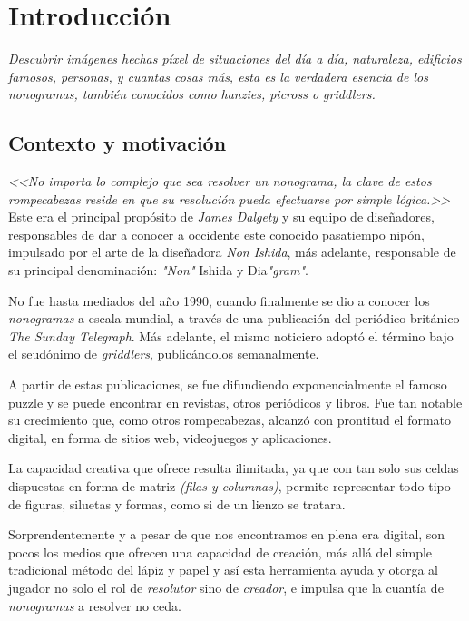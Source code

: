 \chapter{Introducción}

\textit{Descubrir imágenes hechas píxel de situaciones del día a día,
naturaleza, edificios famosos, personas, y cuantas cosas más, esta es la verdadera esencia de
los nonogramas, también conocidos como hanzies, picross o griddlers.}

\section{Contexto y motivación}

\textit{<<No importa lo complejo que sea resolver un nonograma, la clave de
estos rompecabezas reside en que su resolución pueda efectuarse por simple
lógica.>>} Este era el principal propósito de \textit{James Dalgety} y su equipo
de diseñadores, responsables de dar a conocer a occidente este conocido
pasatiempo nipón, impulsado por el arte de la diseñadora \textit{Non Ishida}, más
adelante, responsable de su principal denominación: \textit{"Non"} Ishida y
Dia\textit{"gram"}.

No fue hasta mediados del año 1990, cuando finalmente se dio a conocer los \textit{nonogramas} a escala
mundial, a través de una publicación del periódico británico \textit{The Sunday
Telegraph}. Más adelante, el mismo noticiero adoptó el término bajo el
seudónimo de \textit{griddlers}, publicándolos semanalmente.

A partir de estas publicaciones, se fue difundiendo exponencialmente el famoso puzzle y
se puede encontrar en revistas, otros periódicos y libros. Fue tan notable su
crecimiento que, como otros rompecabezas, alcanzó con prontitud el formato
digital, en forma de sitios web, videojuegos y aplicaciones.

La capacidad creativa que ofrece resulta ilimitada, ya que con tan solo sus
celdas dispuestas en forma de matriz \textit{(filas y columnas)}, permite
representar todo tipo de figuras, siluetas y formas, como si de un lienzo se
tratara. 

Sorprendentemente y a pesar de que nos encontramos en plena era digital, son pocos los
medios que ofrecen una capacidad de creación, más allá del simple
tradicional método del lápiz y papel y así esta herramienta ayuda y otorga al jugador no solo el rol de \textit{resolutor} sino de \textit{creador},
e impulsa que la cuantía de \textit{nonogramas} a resolver no ceda.

